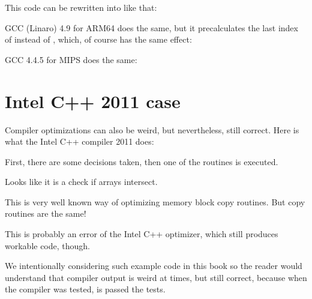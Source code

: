 This code can be rewritten into \CCpp like that:



GCC (Linaro) 4.9 for ARM64 does the same, but it precalculates the last index of  
instead of , which, of course has the same effect:




GCC 4.4.5 for MIPS does the same:



\section{Intel C++ 2011 case}
\myindex{\CompilerAnomaly}
\label{loops_iterators_loop_anomaly}

Compiler optimizations can also be weird, but nevertheless, still correct.
Here is what the Intel C++ compiler 2011 does:



First, there are some decisions taken, then one of the routines is executed.

Looks like it is a check if arrays intersect.

This is very well known way of optimizing memory block copy routines.
But copy routines are the same!

This is probably an error of the Intel C++ optimizer, which still produces workable code, though.

We intentionally considering such example code in this book so the reader would understand that compiler output is weird at times,
but still correct, because when the compiler was tested, is passed the tests.
